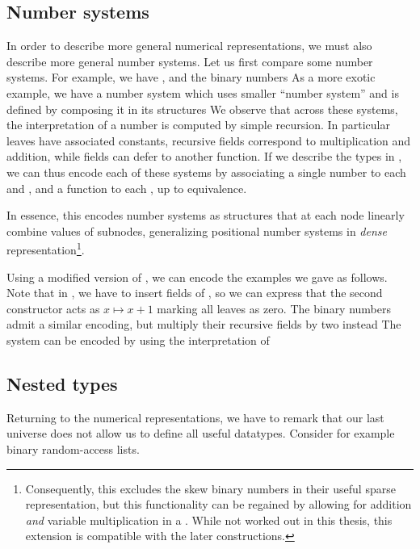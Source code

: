 \subsection{Number systems}

In order to describe more general numerical representations, we must also describe more general number systems. Let us first compare some number systems. For example, we have \bN{}, and the binary numbers
As a more exotic example, we have a number system which uses smaller ``number system''
and is defined by composing it in its structures
We observe that across these systems, the interpretation of a number is computed by simple recursion. In particular leaves have associated constants, recursive fields correspond to multiplication and addition, while fields can defer to another function. If we describe the types in , we can thus encode each of these systems by associating a single number to each  and , and a function to each , up to equivalence.

In essence, this encodes number systems as structures that at each node linearly combine values of subnodes, generalizing positional number systems in \emph{dense} representation\footnote{Consequently, this excludes the skew binary numbers \cite{oka95b} in their useful sparse representation, but this functionality can be regained by allowing for addition \emph{and} variable multiplication in a . While not worked out in this thesis, this extension is compatible with the later constructions.}.

Using a modified version of , we can encode the examples we gave as follows. Note that in \bN{}, we have to insert fields of , so we can express that the second constructor acts as $x \mapsto x + 1$
marking all leaves as zero. The binary numbers admit a similar encoding, but multiply their recursive fields by two instead
The  system can be encoded by using the interpretation of 

\subsection{Nested types}
Returning to the numerical representations, we have to remark that our last universe  does not allow us to define all useful datatypes. Consider for example binary random-access lists.

